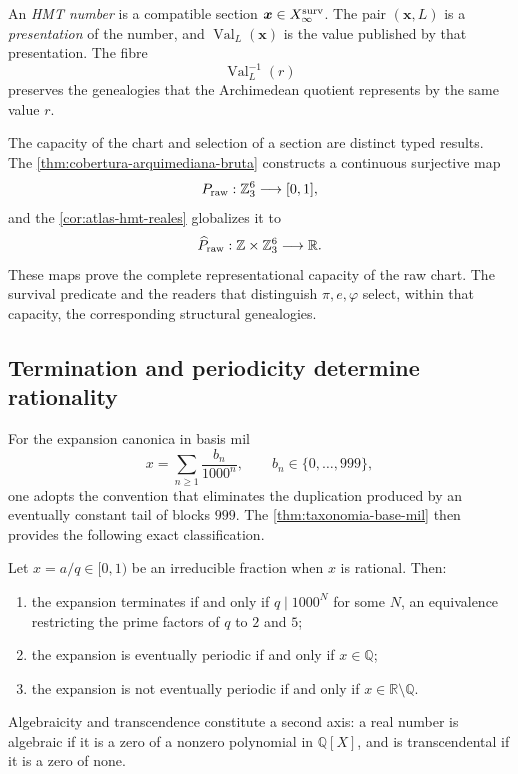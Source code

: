 \begin{definition}
\label{p3-83-c44-s1:def:numero-presentacion-valor-rev11}
An \emph{HMT number} is a compatible section
\(\boldsymbol x\in X_{\infty}^{\rm surv}\). The pair
\((\boldsymbol x,L)\) is a \emph{presentation} of the number, and
\(\operatorname{Val}_{L}(\boldsymbol x)\) is the value published by that
presentation. The fibre
\[
 \operatorname{Val}_{L}^{-1}(r)
\]
preserves the genealogies that the Archimedean quotient represents by
the same value \(r\).
\end{definition}

The capacity of the chart and selection of a
section are distinct typed results. The \cref{thm:cobertura-arquimediana-bruta} constructs
a continuous surjective map
\[
 P_{\rm raw}:\mathbb Z_3^6\longrightarrow[0,1],
\]
and the \cref{cor:atlas-hmt-reales} globalizes it to
\[
 \widehat P_{\rm raw}:\mathbb Z\times\mathbb Z_3^6
 \longrightarrow\mathbb R.
\]
These maps prove the complete representational capacity of the raw chart.
The survival predicate and the readers that distinguish
\(\pi,e,\varphi\) select, within that capacity, the corresponding structural genealogies.

\subsection{Termination and periodicity determine rationality}

For the expansion canonica in basis mil
\[
 x=\sum_{n\geq1}\frac{b_n}{1000^n},
 \qquad b_n\in\{0,\ldots,999\},
\]
one adopts the convention that eliminates the duplication produced by an
eventually constant tail of blocks \(999\). The
\cref{thm:taxonomia-base-mil} then provides the following exact classification.

\begin{theorem}
\label{p3-83-c44-s1:thm:clasificacion-visible-rev11}
Let \(x=a/q\in[0,1)\) be an irreducible fraction when \(x\) is rational.
Then:
\begin{enumerate}
\item the expansion terminates if and only if \(q\mid1000^N\) for some
      \(N\), an equivalence restricting the prime factors of \(q\) to
      \(2\) and \(5\);
\item the expansion is eventually periodic if and only if
      \(x\in\mathbb Q\);
\item the expansion is not eventually periodic if and only if
      \(x\in\mathbb R\setminus\mathbb Q\).
\end{enumerate}
Algebraicity and transcendence constitute a second axis: a real number is
algebraic if it is a zero of a nonzero polynomial in \(\mathbb Q[X]\), and is
transcendental if it is a zero of none.
\end{theorem}

